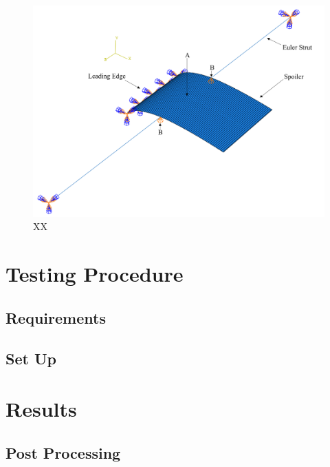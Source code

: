 \documentclass{IEEEtran}
\begin{document}
    \begin{figure}[!h]
        \centering
        \includegraphics[width=\textwidth]{ModellingImages/ModelAssem.png}
        \caption{ XX }
        \label{fig:ModelAssem}
    \end{figure}
	
    \section{Testing Procedure}

    \subsection{Requirements}

    \subsection{Set Up}
	
	\section{Results}

    \subsection{Post Processing}

\end{document}

